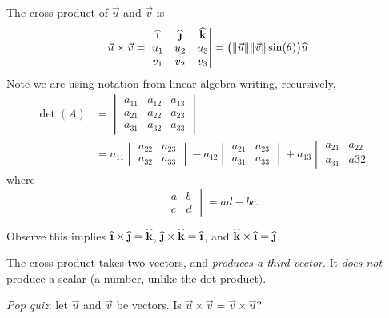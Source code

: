 The cross product of $\vec{u}$ and $\vec{v}$ is 
\begin{equation}
\vec{u}\times\vec{v} = \begin{vmatrix}
\widehat{\textbf{\i}} & \widehat{\textbf{\j}} & \widehat{\mathbf{k}}\\
       u_{1}          &            u_{2}      & u_{3}\\
       v_{1}          &            v_{2}      & v_{3}
\end{vmatrix} =
\bigl(\|\vec{u}\|\|\vec{v}\|\sin(\theta)\bigr)\widehat{u}
\end{equation}
Note we are using notation from linear algebra writing, recursively,
\begin{equation}
\begin{aligned}
\det(A) &= \begin{vmatrix} a_{11} & a_{12} & a_{13}\\
a_{21} & a_{22} & a_{23}\\
a_{31} & a_{32} & a_{33}
\end{vmatrix} \\
&= a_{11}\begin{vmatrix} a_{22} & a_{23} \\ a_{32} &
  a_{33}
\end{vmatrix}
- a_{12} \begin{vmatrix} a_{21} & a_{23}\\ a_{31} & a_{33}
\end{vmatrix}
+a_{13}\begin{vmatrix} a_{21} & a_{22}\\ a_{31} & a{32}
\end{vmatrix}
\end{aligned}
\end{equation}
where
\begin{equation}
\begin{vmatrix} a & b\\ c & d
\end{vmatrix} = ad-bc.
\end{equation}
\begin{remark}
Observe this implies
$\widehat{\textbf{\i}}\times\widehat{\textbf{\j}}=\widehat{\textbf{k}}$, 
$\widehat{\textbf{\j}}\times\widehat{\textbf{k}}=\widehat{\textbf{\i}}$,
and 
$\widehat{\textbf{k}}\times\widehat{\textbf{\i}}=\widehat{\textbf{\j}}$.
\end{remark}
\begin{remark}
The cross-product takes two vectors, and \emph{produces a third vector}.
It \emph{does not} produce a scalar (a number, unlike the dot product).
\end{remark}
\emph{Pop quiz}: let $\vec{u}$ and $\vec{v}$ be vectors. Is $\vec{u}\times\vec{v}=\vec{v}\times\vec{u}$?

